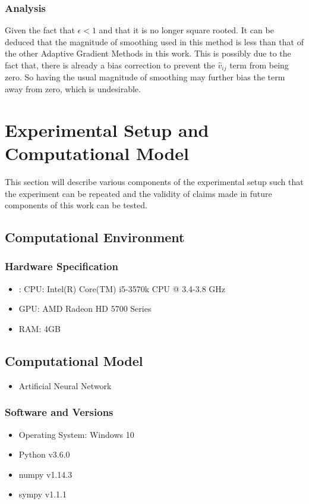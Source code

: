 \documentclass{article}
\begin{document}
\subsubsection{Analysis}
Given the fact that $\epsilon < 1$ and that it is no longer square rooted. It can be deduced that the magnitude of smoothing used in this method is less than that of the other Adaptive Gradient Methods in this work. This is possibly due to the fact that, there is already a bias correction to prevent the $\hat{v}_{ij}$ term from being zero. So having the usual magnitude of smoothing may further bias the term away from zero, which is undesirable.

\section{Experimental Setup and Computational Model}

This section will describe various components of the experimental setup such that the experiment can be repeated and the validity of claims made in future components of this work can be tested.

\subsection{Computational Environment}
\subsubsection{Hardware Specification}
\begin{itemize}
	\item: CPU: Intel(R) Core(TM) i5-3570k CPU @ 3.4-3.8 GHz
	\item  GPU: AMD Radeon HD 5700 Series
	\item  RAM: 4GB
\end{itemize}
\subsection{Computational Model}
\begin{itemize}
	\item Artificial Neural Network
	
\end{itemize}
\subsubsection{Software and Versions}
\begin{itemize}
	\item Operating System: Windows 10
	\item Python v3.6.0
	\item numpy v1.14.3
	\item sympy v1.1.1
\end{itemize}
\end{document}
